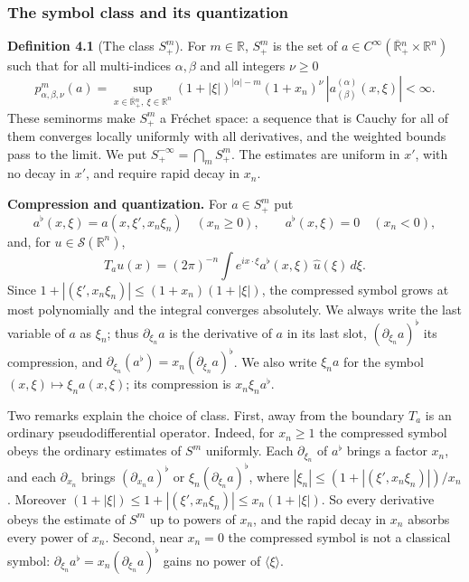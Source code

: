 \documentclass[
  11pt,
]{article}
\begin{document}
\subsubsection{The symbol class and its
quantization}\label{the-symbol-class-and-its-quantization}

\textbf{Definition 4.1} (The class \(S^m_+\)). For \(m\in\mathbb R\),
\(S^m_+\) is the set of
\(a\in C^\infty(\overline{\mathbb R}{}^n_+\times\mathbb R^n)\) such that
for all multi-indices \(\alpha,\beta\) and all integers \(\nu\geq0\) \[
p^m_{\alpha,\beta,\nu}(a)=\sup_{x\in\overline{\mathbb R}{}^n_+,\ \xi\in\mathbb R^n}(1+|\xi|)^{|\alpha|-m}(1+x_n)^{\nu}\,|a^{(\alpha)}_{(\beta)}(x,\xi)|<\infty .
\tag{4.1}
\] These seminorms make \(S^m_+\) a Fréchet space: a sequence that is
Cauchy for all of them converges locally uniformly with all derivatives,
and the weighted bounds pass to the limit. We put
\(S^{-\infty}_+=\bigcap_mS^m_+\). The estimates are uniform in \(x'\),
with no decay in \(x'\), and require rapid decay in \(x_n\).

\textbf{Compression and quantization.} For \(a\in S^m_+\) put \[
a^\flat(x,\xi)=a(x,\xi',x_n\xi_n)\quad(x_n\geq0),\qquad a^\flat(x,\xi)=0\quad(x_n<0),
\tag{4.2}
\] and, for \(u\in\mathcal S(\mathbb R^n)\), \[
T_au(x)=(2\pi)^{-n}\int e^{ix\cdot\xi}a^\flat(x,\xi)\,\widehat u(\xi)\,d\xi .
\tag{4.3}
\] Since \(1+|(\xi',x_n\xi_n)|\leq(1+x_n)(1+|\xi|)\), the compressed
symbol grows at most polynomially and the integral converges absolutely.
We always write the last variable of \(a\) as \(\xi_n\); thus
\(\partial_{\xi_n}a\) is the derivative of \(a\) in its last slot,
\((\partial_{\xi_n}a)^\flat\) its compression, and
\(\partial_{\xi_n}(a^\flat)=x_n(\partial_{\xi_n}a)^\flat\). We also
write \(\xi_na\) for the symbol \((x,\xi)\mapsto\xi_na(x,\xi)\); its
compression is \(x_n\xi_na^\flat\).

Two remarks explain the choice of class. First, away from the boundary
\(T_a\) is an ordinary pseudodifferential operator. Indeed, for
\(x_n\geq1\) the compressed symbol obeys the ordinary estimates of
\(S^m\) uniformly. Each \(\partial_{\xi_n}\) of \(a^\flat\) brings a
factor \(x_n\), and each \(\partial_{x_n}\) brings
\((\partial_{x_n}a)^\flat\) or \(\xi_n(\partial_{\xi_n}a)^\flat\), where
\(|\xi_n|\leq(1+|(\xi',x_n\xi_n)|)/x_n\). Moreover
\((1+|\xi|)\leq1+|(\xi',x_n\xi_n)|\leq x_n(1+|\xi|)\). So every
derivative obeys the estimate of \(S^m\) up to powers of \(x_n\), and
the rapid decay in \(x_n\) absorbs every power of \(x_n\). Second, near
\(x_n=0\) the compressed symbol is not a classical symbol:
\(\partial_{\xi_n}a^\flat=x_n(\partial_{\xi_n}a)^\flat\) gains no power
of \(\langle\xi\rangle\).
\end{document}
